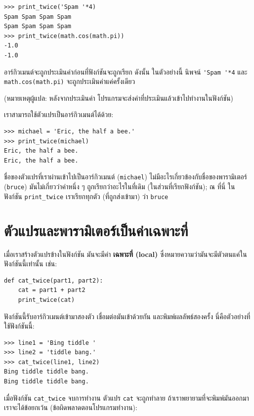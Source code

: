 \begin{verbatim}
>>> print_twice('Spam '*4)
Spam Spam Spam Spam
Spam Spam Spam Spam
>>> print_twice(math.cos(math.pi))
-1.0
-1.0
\end{verbatim}
%
อาร์กิวเมนต์จะถูกประเมินค่าก่อนที่ฟังก์ชันจะถูกเรียก  ดังนั้น ในตัวอย่างนี้ นิพจน์ \verb"'Spam '*4"
และ {\tt math.cos(math.pi)} จะถูกประเมินค่าแค่ครั้งเดียว 

(หมายเหตุผู้แปล: หลังจากประเมินค่า โปรแกรมจะส่งค่าที่ประเมินแล้วเข้าไปทำงานในฟังก์ชัน)

เราสามารถใช้ตัวแปรเป็นอาร์กิวเมนต์ได้ด้วย:

\begin{verbatim}
>>> michael = 'Eric, the half a bee.'
>>> print_twice(michael)
Eric, the half a bee.
Eric, the half a bee.
\end{verbatim}
% 
ชื่อของตัวแปรที่เราผ่านเข้าไปเป็นอาร์กิวเมนต์ ({\tt michael}) ไม่มีอะไรเกี่ยวข้องกับชื่อของพารามิเตอร์ 
({\tt bruce}) มันไม่เกี่ยวว่าค่าหนึ่ง ๆ ถูกเรียกว่าอะไรในที่เดิม (ในส่วนที่เรียกฟังก์ชัน);
ณ ที่นี่ ในฟังก์ชัน \verb|print_twice| เราเรียกทุกตัว (ที่ถูกส่งเข้ามา) ว่า {\tt bruce}

\section{ตัวแปรและพารามิเตอร์เป็นค่าเฉพาะที่} %

เมื่อเราสร้างตัวแปรข้างในฟังก์ชัน มันจะมีค่า {\bf เฉพาะที่ (local)}
ซึ่งหมายความว่ามันจะมีตัวตนแค่ในฟังก์ชันนี้เท่านั้น เช่น:

\begin{verbatim}
def cat_twice(part1, part2):
    cat = part1 + part2
    print_twice(cat)
\end{verbatim}
%
ฟังก์ชันนี้รับอาร์กิวเมนต์เข้ามาสองตัว เชื่อมต่อมันเข้าด้วยกัน และพิมพ์ผลลัพธ์สองครั้ง
นี่คือตัวอย่างที่ใช้ฟังก์ชันนี้:

\begin{verbatim}
>>> line1 = 'Bing tiddle '
>>> line2 = 'tiddle bang.'
>>> cat_twice(line1, line2)
Bing tiddle tiddle bang.
Bing tiddle tiddle bang.
\end{verbatim}
%
เมื่อฟังก์ชัน \verb|cat_twice| จบการทำงาน ตัวแปร {\tt cat} จะถูกทำลาย
ถ้าเราพยายามที่จะพิมพ์มันออกมา เราจะได้ข้อยกเว้น (ข้อผิดพลาดตอนโปรแกรมทำงาน):


